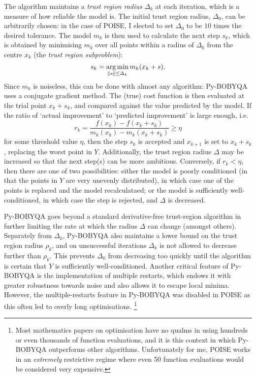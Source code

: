 The algorithm maintains a \textit{trust region radius} $\Delta_k$ at each iteration, which is a measure of how reliable the model is.
The initial trust region radius, $\Delta_0$, can be arbitrarily chosen: in the case of POISE, I elected to set $\Delta_0$ to be $10$ times the desired tolerance.
The model $m_k$ is then used to calculate the next step $s_k$, which is obtained by minimising $m_k$ over all points within a radius of $\Delta_k$ from the centre $x_k$ (the \textit{trust region subproblem}):
\begin{equation}
    \label{eq:trust_region_subproblem}
    s_k = \operatorname*{arg\,min}_{\lVert s \rVert \leq \Delta_k} m_k(x_k + s).
\end{equation}
Since $m_k$ is noiseless, this can be done with almost any algorithm: Py-BOBYQA uses a conjugate gradient method.
The (true) cost function is then evaluated at the trial point $x_k + s_k$, and compared against the value predicted by the model.
If the ratio of `actual improvement' to `predicted improvement' is large enough, i.e.
\begin{equation}
    \label{eq:trust_region_threshold}
    r_k = \frac{f(x_k) - f(x_k + s_k)}{m_k(x_k) - m_k(x_k + s_k)} \geq \eta
\end{equation}
for some threshold value $\eta$, then the step $s_k$ is accepted and $x_{k+1}$ is set to $x_k + s_k$, replacing the worst point in $Y$.
Additionally, the trust region radius $\Delta$ may be increased so that the next step(s) can be more ambitious.
Conversely, if $r_k < \eta$, then there are one of two possibilities: either the model is poorly conditioned (in that the points in $Y$ are very unevenly distributed), in which case one of the points is replaced and the model recalculataed; or the model is sufficiently well-conditioned, in which case the step is rejected, and $\Delta$ is decreased.

Py-BOBYQA goes beyond a standard derivative-free trust-region algorithm in further limiting the rate at which the radius $\Delta$ can change (amongst others).
Separately from $\Delta_k$, Py-BOBYQA also maintains a lower bound on the trust region radius $\rho_k$, and on unsuccessful iterations $\Delta_k$ is not allowed to decrease further than $\rho_k$.
This prevents $\Delta_k$ from decreasing too quickly until the algorithm is certain that $Y$ is sufficiently well-conditioned.\autocite{Powell2003MP}
Another critical feature of Py-BOBYQA is the implementation of multiple restarts, which endows it with greater robustness towards noise and also allows it to escape local minima.\autocite{Cartis2019ACMTMS,Cartis2022O}
However, the multiple-restarts feature in Py-BOBYQA was disabled in POISE as this often led to overly long optimisations.%
\footnote{Most mathematics papers on optimisation have no qualms in using hundreds or even thousands of function evaluations, and it is this context in which Py-BOBYQA outperforms other algorithms. Unfortunately for me, POISE works in an \textit{extremely} restrictive regime where even 50 function evaluations would be considered very expensive.}

